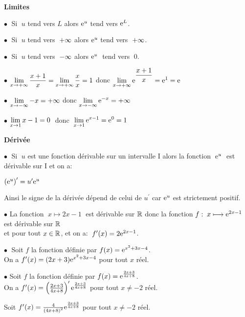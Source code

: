 \textbf{Limites}\\
\begin{property}
$ \bullet\; $  Si $\; u  $ tend vers $ L $ alors $ \mathrm{e}^{ u }$  tend vers $\mathrm{e}^{L}$. 

\medskip
$ \bullet \;$  Si $\; u  $ tend vers $ \;+\infty $  alors $ \mathrm{e}^{ u }$   tend vers $ \;+\infty $.


\medskip
$ \bullet \;$  Si $\; u  $ tend vers $\;-\infty $  alors  $ \mathrm{e}^{u}\;$ tend vers  $ \;0$.

\end{property}

\begin{example}

$ \bullet $  $ \displaystyle \lim_{x\to +\infty}\dfrac{x+1}{x}=\displaystyle \lim_{x\to +\infty}\dfrac{x}{x}=1 $ donc $ \displaystyle \lim_{x\to +\infty}\mathrm{e}^{\dfrac{x+1}{x}}=\mathrm{e}^{1}=\mathrm{e}^{}$
\medskip

$ \bullet $  $ \displaystyle \lim_{x\to -\infty}-x=+\infty $ donc $ \displaystyle \lim_{x\to -\infty}\mathrm{e}^{-x}=+\infty$

\medskip

 
 $ \bullet $  $ \displaystyle \lim_{x\to 1}x-1=0 \;$ donc $ \;\displaystyle \lim_{x\to 1}\mathrm{e}^{x-1}=  \mathrm{e}^{0}=1$


\end{example}

\textbf{Dérivée }

\begin{theorem}
$ \bullet \; $ Si  $ \;u $  est  une fonction dérivable  sur un intervalle I alors la fonction \; $\; \mathrm{e}^{ u}\;$ est dérivable sur I et on a: 
\medskip

 $ \left(\mathrm{e}^{ u}\right)^{\prime}=u^{\prime}\mathrm{e}^{ u} $
\end{theorem}
 Ainsi le signe de la dérivée dépend de celui de $u^{\prime}  $  car  $ \mathrm{e}^{ u} $ est strictement positif.
\begin{example}

$ \bullet $  La fonction   $ \; x\longmapsto 2x-1 \;$  est dérivable sur 
$ \mathbb{R} $ donc la fonction $f:\;  x\longmapsto \mathrm{e}^{2x-1} $ est dérivable sur $ \mathbb{R} $ \\

et pour tout $ x\in\mathbb{R}$, et  on a: $\; f^{\prime}(x)= 2\mathrm{e}^{2x-1} $.

\bigskip

$ \bullet \;$ Soit $ f $ la fonction  définie par $ f(x)= \mathrm{e}^{{x^2} + 3x - 4 } $.\\
On  a $ f^{\prime}(x)=(2x+3) \mathrm{e}^{{x^2} + 3x - 4 } $  pour tout $ x $  réel.

\bigskip

$ \bullet $\; Soit $ f $ la fonction  définie par $ f(x)= \mathrm{e}^{\frac{2x+3}{4x+8} } $.\\
On  a $ f^{\prime}(x)=\left(\frac{2x+3}{4x+8}\right)^{\prime} \mathrm{e}^{\frac{2x+3}{4x+8} } $  pour tout $ x\neq -2 $  réel.
\bigskip

Soit  \; $ f^{\prime}(x)=\frac{4}{\left(4x+8\right)^{2}}  \mathrm{e}^{\frac{2x+3}{4x+8} } $  pour tout $ x\neq -2 $  réel.
 
\end{example}

